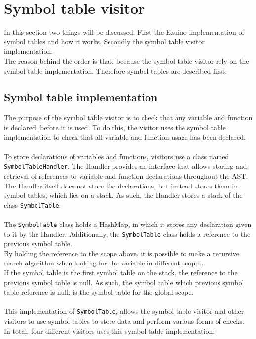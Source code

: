 \section{Symbol table visitor}
In this section two things will be discussed. First the Ezuino implementation of symbol tables and how it works. Secondly the symbol table visitor implementation.\\
The reason behind the order is that: because the symbol table visitor rely on the symbol table implementation. Therefore symbol tables are described first.

\subsection{Symbol table implementation}\label{SymbolTableImpl}
The purpose of the symbol table visitor is to check that any variable and function is declared, before it is used. To do this, the visitor uses the symbol table implementation to check that all variable and function usage has been declared.
\\\\
To store declarations of variables and functions, visitors use a class named \texttt{SymbolTableHandler}. The Handler provides an interface that allows storing and retrieval of references to variable and function declarations throughout the AST.
The Handler itself does not store the declarations, but instead stores them in symbol tables, which lies on a stack. As such, the Handler stores a stack of the class \texttt{SymbolTable}.
\\\\
The \texttt{SymbolTable} class holds a HashMap, in which it stores any declaration given to it by the Handler. Additionally, the \texttt{SymbolTable} class holds a reference to the previous symbol table.\\
By holding the reference to the scope above, it is possible to make a recursive search algorithm when looking for the variable in different scopes.\\
If the symbol table is the first symbol table on the stack, the reference to the previous symbol table is null. As such, the symbol table which previous symbol table reference is null, is the symbol table for the global scope.
\\\\
This implementation of \texttt{SymbolTable}, allows the symbol table visitor and other visitors to use symbol tables to store data and perform various forms of checks. In total, four different visitors uses this symbol table implementation:
